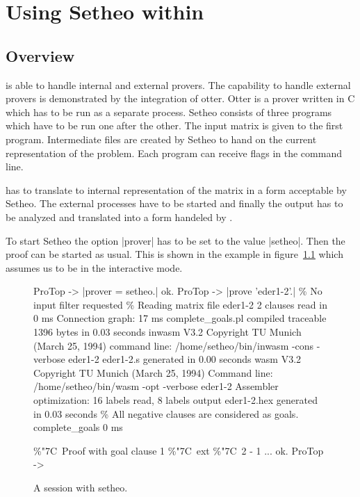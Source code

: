 
\chapter{Using Setheo within \ProTop}


\section{Overview}

\ProTop{} is able to handle internal and external provers. The capability to
handle external provers is demonstrated by the integration of otter. Otter is
a prover written in C which has to be run as a separate process. Setheo
consists of three programs which have to be run one after the other. The input
matrix is given to the first program. Intermediate files are created by Setheo
to hand on the current representation of the problem. Each program can receive
flags in the command line.

\ProTop{} has to translate to internal representation of the matrix in a form
acceptable by Setheo. The external processes have to be started and finally
the output has to be analyzed and translated into a form handeled by \ProTop.

To start Setheo the option |prover| has to be set to the value |setheo|. Then
the proof can be started as usual. This is shown in the example in
figure~\ref{fig:setheo} which assumes us to be in the \ProTop{} interactive
mode.

\begin{figure}[ht]
\begin{BoxedSample}
 ProTop -> |prover = setheo.|
 ok.
 ProTop -> |prove 'eder1-2'.|
 \% No input filter requested
 \% Reading matrix file eder1-2
 2 clauses read in 0 ms 
 Connection graph: 17 ms 
 complete\_goals.pl compiled traceable 1396 bytes in 0.03 seconds
 inwasm V3.2 Copyright TU Munich (March 25, 1994) 
 command line: /home/setheo/bin/inwasm -cons -verbose eder1-2 
 eder1-2.s generated in  0.00 seconds
 wasm V3.2 Copyright TU Munich (March 25, 1994)
 Command line: /home/setheo/bin/wasm -opt -verbose eder1-2 
 Assembler optimization: 16 labels read, 8 labels output
 eder1-2.hex generated in  0.03 seconds
 \% All negative clauses are considered as goals.
 complete\_goals 0 ms 

 \%\char"7C\ Proof with goal clause 1
 \%\char"7C\      ext
 \%\char"7C\      2 - 1
 ...
 ok.
 ProTop -> 
\end{BoxedSample}
\caption{A session with setheo.}\label{fig:setheo}
\end{figure}



